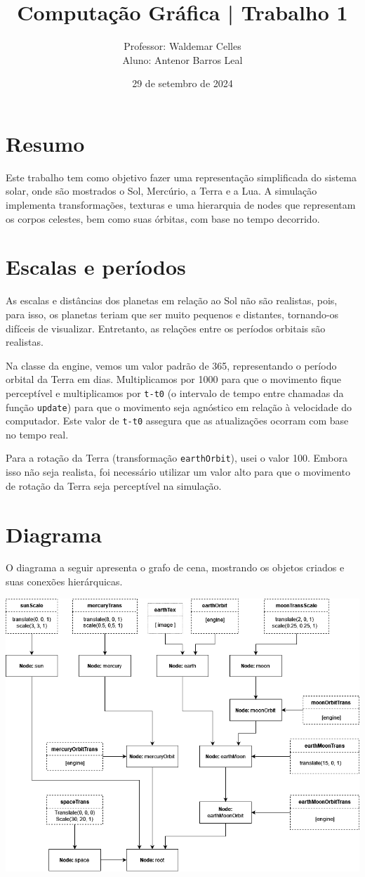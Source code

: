 \documentclass[11pt, a4paper]{article}
\title{Computação Gráfica | Trabalho 1}
\author{Professor: Waldemar Celles\\
Aluno: Antenor Barros Leal}
\date{29 de setembro de 2024}
\begin{document}
\maketitle

\section {Resumo}
Este trabalho tem como objetivo fazer uma representação simplificada do sistema 
solar, onde são mostrados o Sol, Mercúrio, a Terra e a Lua. A simulação 
implementa transformações, texturas e uma hierarquia de nodes que representam os
 corpos celestes, bem como suas órbitas, com base no tempo decorrido.

\section {Escalas e períodos}

As escalas e distâncias dos planetas em relação ao Sol não são realistas, pois, 
para isso, os planetas teriam que ser muito pequenos e distantes, tornando-os 
difíceis de visualizar. Entretanto, as relações entre os períodos orbitais são 
realistas.

Na classe da engine, vemos um valor padrão de 365, representando o período 
orbital da Terra em dias. Multiplicamos por 1000 para que o movimento fique 
perceptível e multiplicamos por \texttt{t-t0} (o intervalo de tempo entre 
chamadas da função \texttt{update}) para que o movimento seja agnóstico em 
relação à velocidade do computador. Este valor de \texttt{t-t0} assegura que as 
atualizações ocorram com base no tempo real.

Para a rotação da Terra (transformação \texttt{earthOrbit}), usei o valor 100. 
Embora isso não seja realista, foi necessário utilizar um valor alto para que o 
movimento de rotação da Terra seja perceptível na simulação.

\section {Diagrama}

O diagrama a seguir apresenta o grafo de cena, mostrando os objetos criados e 
suas conexões hierárquicas.

\includegraphics[width=0.8\linewidth]{Trab1Graph.png}
\end{document}
